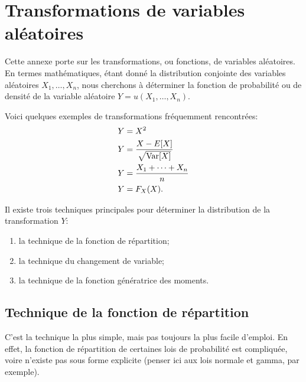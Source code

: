 
\chapter{Transformations de variables aléatoires}
\label{chap:rappels_transformations}

Cette annexe porte sur les transformations, ou fonctions, de variables
aléatoires. En termes mathématiques, étant donné la distribution
conjointe des variables aléatoires $X_1, \dots, X_n$, nous cherchons à
déterminer la fonction de probabilité ou de densité de la variable
aléatoire $Y = u(X_1, \dots, X_n)$.

Voici quelques exemples de transformations fréquemment rencontrées:
\begin{align*}
  Y &= X^2 \\
  Y &= \frac{X - E [ X ]}{\sqrt{\operatorname{Var} [ X ]}} \\
  Y &= \frac{X_1 + \dots + X_n}{n} \\
  Y &= F_X(X).
\end{align*}

Il existe trois techniques principales pour déterminer la distribution
de la transformation $Y$:
\begin{enumerate}
\item la technique de la fonction de répartition;
\item la technique du changement de variable;
\item la technique de la fonction génératrice des moments.
\end{enumerate}


\section{Technique de la fonction de répartition}

C'est la technique la plus simple, mais pas toujours la plus facile
d'emploi. En effet, la fonction de répartition de certaines lois de
probabilité est compliquée, voire n'existe pas sous forme explicite
(penser ici aux lois normale et gamma, par exemple).

